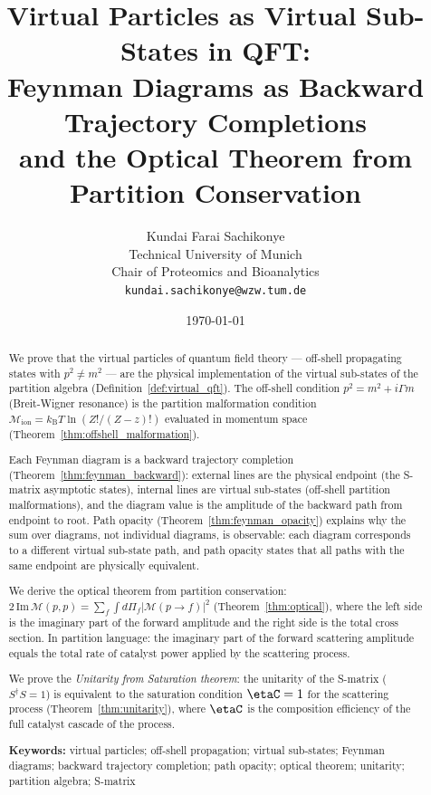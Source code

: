 \documentclass[twocolumn,10pt,a4paper]{article}
\title{\textbf{Virtual Particles as Virtual Sub-States in QFT:\\
Feynman Diagrams as Backward Trajectory Completions\\
and the Optical Theorem from Partition Conservation}}
\author{
Kundai Farai Sachikonye\\
Technical University of Munich\\
Chair of Proteomics and Bioanalytics\\
\texttt{kundai.sachikonye@wzw.tum.de}
}
\date{\today}
\theoremstyle{thmstyle}
\theoremstyle{definition}
\theoremstyle{remark}
\newcommand{\kB}{k_{\mathrm{B}}}
\newcommand{\Mop}{\mathcal{M}}
\begin{document}
\maketitle

\begin{abstract}
\noindent
We prove that the virtual particles of quantum field theory ---
off-shell propagating states with $p^2 \neq m^2$ --- are the physical
implementation of the virtual sub-states of the partition algebra
(Definition~\ref{def:virtual_qft}).
The off-shell condition $p^2 = m^2 + i\Gamma m$ (Breit-Wigner resonance)
is the partition malformation condition $\Mop_{\mathrm{ion}} = \kB T\ln(Z!/(Z-z)!)$
evaluated in momentum space (Theorem~\ref{thm:offshell_malformation}).

Each Feynman diagram is a backward trajectory completion
(Theorem~\ref{thm:feynman_backward}): external lines are the physical
endpoint (the S-matrix asymptotic states), internal lines are virtual
sub-states (off-shell partition malformations), and the diagram value
is the amplitude of the backward path from endpoint to root.
Path opacity (Theorem~\ref{thm:feynman_opacity}) explains why the sum
over diagrams, not individual diagrams, is observable: each diagram
corresponds to a different virtual sub-state path, and path opacity
states that all paths with the same endpoint are physically equivalent.

We derive the optical theorem from partition conservation:
$2\,\mathrm{Im}\,\mathcal{M}(p,p) = \sum_f\int d\Pi_f|\mathcal{M}(p\to f)|^2$
(Theorem~\ref{thm:optical}), where the left side is the imaginary part
of the forward amplitude and the right side is the total cross section.
In partition language: the imaginary part of the forward scattering amplitude
equals the total rate of catalyst power applied by the scattering process.

We prove the \emph{Unitarity from Saturation theorem}: the unitarity of
the S-matrix ($S^\dagger S = 1$) is equivalent to the saturation condition
$\etaC = 1$ for the scattering process (Theorem~\ref{thm:unitarity}),
where $\etaC$ is the composition efficiency of the
full catalyst cascade of the process.

\medskip
\noindent\textbf{Keywords:} virtual particles; off-shell propagation;
virtual sub-states; Feynman diagrams; backward trajectory completion;
path opacity; optical theorem; unitarity; partition algebra; S-matrix
\end{abstract}

\tableofcontents
\end{document}
